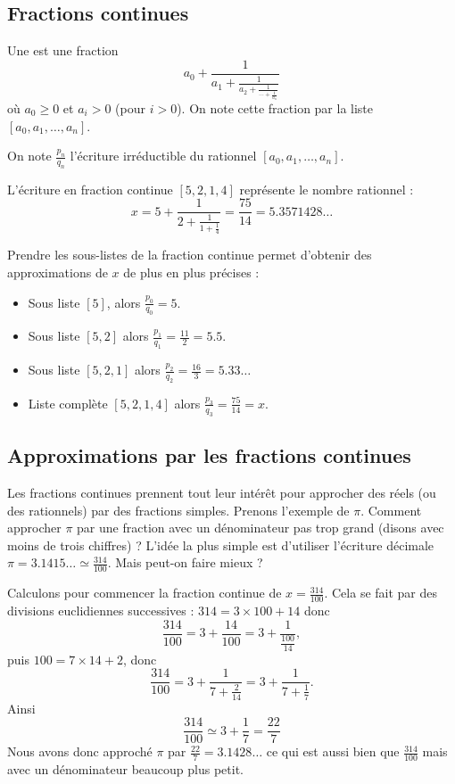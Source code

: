 \documentclass[11pt,class=report,crop=false]{standalone}
\begin{document}
\subsection{Fractions continues}


Une  est une fraction 
$$a_0 + \frac{1}{a_1 + \frac{1}{a_2+\frac{1}{\cdots+\frac{1}{a_n}}}}$$
où $a_0\ge0$ et $a_i>0$ (pour $i>0$). On note cette fraction par la liste $[a_0,a_1,\ldots,a_n]$.

On note $\frac{p_n}{q_n}$ l'écriture irréductible du rationnel $[a_0,a_1,\ldots,a_n]$.

\begin{exemple}
L'écriture en fraction continue $[5,2,1,4]$ représente le nombre rationnel :
$$x = 5 + \frac{1}{2 + \frac{1}{1 + \frac{1}{4}}} = \frac{75}{14} =  5.3571428\ldots$$

Prendre les sous-listes de la fraction continue permet d'obtenir des approximations de $x$ de plus en plus précises :
\begin{itemize}
  \item Sous liste $[5]$, alors $\frac{p_0}{q_0} = 5$.
  \item Sous liste $[5,2]$ alors $\frac{p_1}{q_1} = \frac{11}{2} = 5.5$.
  \item Sous liste $[5,2,1]$ alors $\frac{p_2}{q_2} = \frac{16}{3} = 5.33\ldots$
  \item Liste complète $[5,2,1,4]$ alors $\frac{p_3}{q_3} = \frac{75}{14} = x$.
\end{itemize}

\end{exemple}

\subsection{Approximations par les fractions continues}

Les fractions continues prennent tout leur intérêt pour approcher des réels (ou des rationnels) par des fractions simples.
Prenons l'exemple de $\pi$. Comment approcher $\pi$ par une fraction avec un dénominateur pas trop grand (disons avec moins de trois chiffres) ?
L'idée la plus simple est d'utiliser l'écriture décimale $\pi = 3.1415\ldots \simeq \frac{314}{100}$. Mais peut-on faire mieux ?

Calculons pour commencer la fraction continue de $x = \frac{314}{100}$.
Cela se fait par des divisions euclidiennes successives :
$314 = 3 \times 100 + 14$ donc
$$\frac{314}{100} = 3 + \frac{14}{100} = 3 + \frac{1}{\frac{100}{14}},$$
puis $100 = 7 \times 14 + 2$, donc  
$$\frac{314}{100} = 3 + \frac{1}{7+\frac{2}{14}} = 3 + \frac{1}{7+\frac{1}{7}}.$$
Ainsi $$\frac{314}{100} \simeq 3 + \frac{1}{7} = \frac{22}{7}$$
Nous avons donc approché $\pi$ par $\frac{22}{7} = 3.1428\ldots$ ce qui est aussi bien que $\frac{314}{100}$ mais avec un dénominateur beaucoup plus petit.
\end{document}
